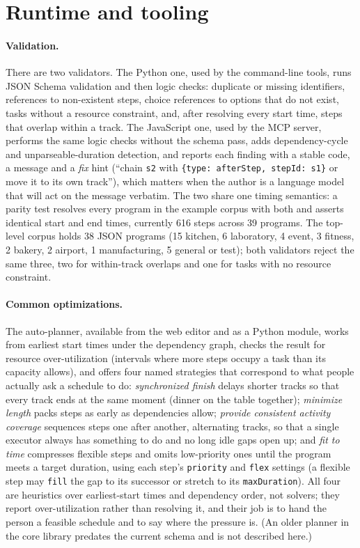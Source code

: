 \documentclass[10pt]{article}
\newcommand{\code}[1]{\texttt{#1}}
\begin{document}
\section{Runtime and tooling}
\label{sec:runtime}

\paragraph{Validation.} There are two validators. The Python one, used by the command-line tools, runs JSON Schema validation and then logic checks: duplicate or missing identifiers, references to non-existent steps, choice references to options that do not exist, tasks without a resource constraint, and, after resolving every start time, steps that overlap within a track. The JavaScript one, used by the MCP server, performs the same logic checks without the schema pass, adds dependency-cycle and unparseable-duration detection, and reports each finding with a stable code, a message and a \emph{fix} hint (``chain \code{s2} with \code{\{type:\,afterStep, stepId:\,s1\}} or move it to its own track''), which matters when the author is a language model that will act on the message verbatim. The two share one timing semantics: a parity test resolves every program in the example corpus with both and asserts identical start and end times, currently 616 steps across 39 programs. The top-level corpus holds 38 JSON programs (15 kitchen, 6 laboratory, 4 event, 3 fitness, 2 bakery, 2 airport, 1 manufacturing, 5 general or test); both validators reject the same three, two for within-track overlaps and one for tasks with no resource constraint.

\paragraph{Common optimizations.}
\label{sec:optim}
The auto-planner, available from the web editor and as a Python module, works from earliest start times under the dependency graph, checks the result for resource over-utilization (intervals where more steps occupy a task than its capacity allows), and offers four named strategies that correspond to what people actually ask a schedule to do: \emph{synchronized finish} delays shorter tracks so that every track ends at the same moment (dinner on the table together); \emph{minimize length} packs steps as early as dependencies allow; \emph{provide consistent activity coverage} sequences steps one after another, alternating tracks, so that a single executor always has something to do and no long idle gaps open up; and \emph{fit to time} compresses flexible steps and omits low-priority ones until the program meets a target duration, using each step's \code{priority} and \code{flex} settings (a flexible step may \code{fill} the gap to its successor or stretch to its \code{maxDuration}). All four are heuristics over earliest-start times and dependency order, not solvers; they report over-utilization rather than resolving it, and their job is to hand the person a feasible schedule and to say where the pressure is. (An older planner in the core library predates the current schema and is not described here.)
\end{document}
